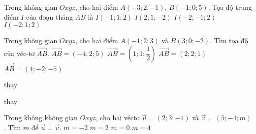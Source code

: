 \begin{ex}%
	Trong không gian $Oxyz$, cho hai điểm $A(-3;2;-1)$, $B(-1;0;5)$. Tọa độ trung điểm $I$ của đoạn thẳng $AB$ là
	\choice
	{$I(-1;1;2)$}
	{$I(2;1;-2)$}
	{$I(-2;-1;2)$}
	{\True $I(-2;1;2)$}
	\end{ex}

\begin{ex}%
	Trong không gian $Oxyz$, cho hai điểm $A(-1;2;3)$ và $B(3;0;-2)$. Tìm tọa độ của véc-tơ $\overrightarrow{AB}$.
	\choice
	{$\overrightarrow{AB}=\left(-4;2;5\right)$}
	{$\overrightarrow{AB}=\left(1;1;\dfrac{1}{2}\right)$}
	{$\overrightarrow{AB}=\left(2;2;1\right)$}
	{\True $\overrightarrow{AB}=\left(4;-2;-5\right)$}
\end{ex}

\begin{ex}%
	thay
\end{ex}

\begin{ex}%
	thay
\end{ex}

\begin{ex}%
	Trong không không gian $Oxyz$, cho hai véctơ $\overrightarrow{u}=(2;3 ;-1)$ và $\overrightarrow{v}=(5;-4;m)$. Tìm $m$ để $\overrightarrow{u}\perp \overrightarrow{v}$.
	\choice
	{\True $m=-2$}
	{$m=2$}
	{$m=0$}
	{$m=4$}
\end{ex}

